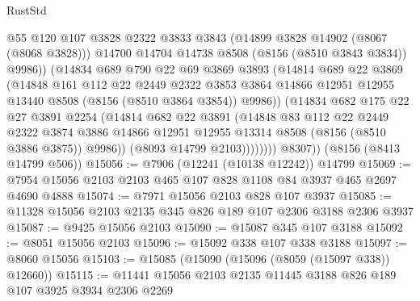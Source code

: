 \begin{lexlean}{RustStd}
\begin{coremodule}
{\begin{coremodule}
{{{{{{{{{{{{{{{{{{{{{{{{{{{{{{{{{{                      @55
                      @120
                      @107
                      @3828
                      @2322
                      @3833
                      @3843
                      (@14899 @3828 @14902 (@8067 (@8068 @3828)))
                      @14700
                      @14704
                      @14738
                      @8508
                      (@8156 (@8510 @3843 @3834))
                      @9986))
                  (@14834
                    @689
                    @790
                    @22
                    @69
                    @3869
                    @3893
                    (@14814
                      @689
                      @22
                      @3869
                      (@14848
                        @161
                        @112
                        @22
                        @2449
                        @2322
                        @3853
                        @3864
                        @14866
                        @12951
                        @12955
                        @13440
                        @8508
                        (@8156 (@8510 @3864 @3854))
                        @9986))
                    (@14834
                      @682
                      @175
                      @22
                      @27
                      @3891
                      @2254
                      (@14814
                        @682
                        @22
                        @3891
                        (@14848
                          @83
                          @112
                          @22
                          @2449
                          @2322
                          @3874
                          @3886
                          @14866
                          @12951
                          @12955
                          @13314
                          @8508
                          (@8156 (@8510 @3886 @3875))
                          @9986))
                      (@8093 @14799 @2103))))))))
        @8307))
    (@8156 (@8413 @14799 @506))
@15056 := @7906 (@12241 (@10138 @12242)) @14799
@15069 := @7954 @15056 @2103 @2103 @465 @107 @828 @1108 @84 @3937 @465 @2697 @4690 @4888
@15074 := @7971 @15056 @2103 @828 @107 @3937
@15085 := @11328 @15056 @2103 @2135 @345 @826 @189 @107 @2306 @3188 @2306 @3937
@15087 := @9425 @15056 @2103
@15090 := @15087 @345 @107 @3188
@15092 := @8051 @15056 @2103
@15096 := @15092 @338 @107 @338 @3188
@15097 := @8060 @15056
@15103 := @15085 (@15090 (@15096 (@8059 (@15097 @338)) @12660))
@15115 := @11441 @15056 @2103 @2135 @11445 @3188 @826 @189 @107 @3925 @3934 @2306 @2269
}}}}}}}}}}}}}}}}}}}}}}}}}}}}}}}}}}
\end{coremodule}}
\end{coremodule}
\end{lexlean}
